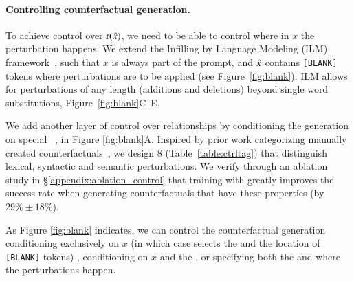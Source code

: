 \paragraph{Controlling counterfactual generation.}
To achieve control over $\operatorname*{r}(\hat{x})$, we need to be able to control where in $x$ the perturbation happens. 
We extend the Infilling by Language Modeling (ILM) framework~\cite{donahue2020enabling}, such that $x$ is always part of the prompt, and $\hat{x}$ contains \texttt{[BLANK]} tokens where perturbations are to be applied (see Figure~\ref{fig:blank}). 
ILM allows for perturbations of any length (additions and deletions) beyond single word substitutions, \eg Figure~\ref{fig:blank}C--E.

We add another layer of control over relationships by conditioning the generation on special \tagstrs~\cite{raffel2019exploring, Dathathri2020Plug}, \eg {} in Figure \ref{fig:blank}A.
Inspired by prior work categorizing manually created counterfactuals~\cite{kaushik2019learning, gardner2020contrast}, we design 8 \tagstrshorts (Table~\ref{table:ctrltag}) that distinguish lexical, syntactic and semantic perturbations. 
We verify through an ablation study in \S\ref{appendix:ablation_control} that training \sysname with \tagstrs greatly improves the success rate when generating counterfactuals that have these properties (by $29\% \pm 18\%$). 

As Figure \ref{fig:blank} indicates, we can control the counterfactual generation conditioning exclusively on $x$ (in which case \sysname selects the \tagstr and the location of \texttt{[BLANK]} tokens) , conditioning on $x$ and the \tagstr, or specifying both the \tagstrshort and where the perturbations happen.





